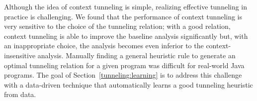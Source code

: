 Although the idea of context tunneling is simple, realizing effective
tunneling in practice is challenging. We found that the performance of
context tunneling is very sensitive to the choice of the tunneling
relation; with a good relation, context tunneling is able to improve the
baseline analysis significantly but, with an inappropriate choice, the analysis
becomes even inferior to the context-insensitive analysis.  Manually finding a general heuristic rule to
generate an optimal tunneling relation for a given program was
difficult for real-world Java programs.
The goal of Section~\ref{tunneling:learning} is to address this challenge
with a data-driven technique that automatically learns a good
tunneling heuristic from data.


